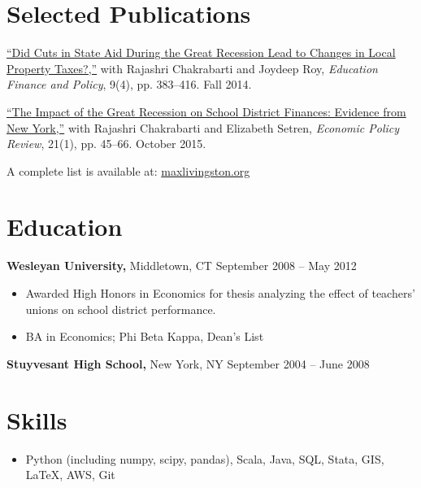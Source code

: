 \documentclass{res}
\begin{document}
\begin{resume}
\begin{itemize}
\begin{itemize}
    \end{itemize}
  \end{itemize}
  
  \section{Selected Publications} 
  \href{http://bit.ly/20jcEax}{``Did Cuts in State Aid During the Great Recession Lead to Changes in Local Property Taxes?,''} with Rajashri Chakrabarti and Joydeep Roy, {\it Education Finance and Policy}, 9(4), pp. 383--416. Fall 2014.

  \href{http://nyfed.org/1WHN3d1}{``The Impact of the Great Recession on School District Finances: Evidence from New York,''} with Rajashri Chakrabarti and Elizabeth Setren, {\it Economic Policy Review}, 21(1), pp. 45--66. October 2015.


  A complete list is available at: \href{http://maxlivingston.org}{maxlivingston.org}

\section{Education} 
  {\bf Wesleyan University,} Middletown, CT \hfill September 2008 -- May 2012
  \begin{itemize} \itemsep -2pt
  \item Awarded High Honors in Economics for thesis analyzing the effect of teachers' unions on school district performance.
  \item BA in Economics; Phi Beta Kappa, Dean's List
  \end{itemize}

  {\bf Stuyvesant High School,} New York, NY \hfill September 2004 -- June 2008

  \section{Skills}
  \begin{itemize} \itemsep -2pt
  \item Python (including numpy, scipy, pandas), Scala, Java, SQL, Stata, GIS, \LaTeX, AWS, Git
  \end{itemize}

\end{resume} 
\end{document}
